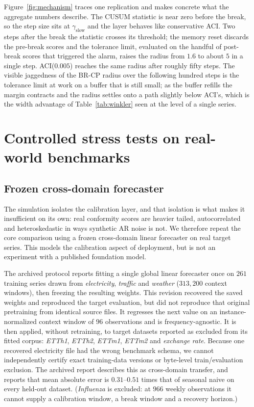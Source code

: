 \documentclass[10pt]{article}
\begin{document}
Figure~\ref{fig:mechanism} traces one replication and makes concrete what the
aggregate numbers describe. The CUSUM statistic is near zero before the break,
so the step size sits at $\gamma_{\text{slow}}$ and the layer behaves like
conservative ACI. Two steps after the break the statistic crosses its
threshold; the memory reset discards the pre-break scores and the tolerance
limit, evaluated on the handful of post-break scores that triggered the alarm,
raises the radius from $1.6$ to about $5$ in a single step. ACI($0.005$) reaches
the same radius after roughly fifty steps. The visible jaggedness of the BR-CP
radius over the following hundred steps is the tolerance limit at work on a
buffer that is still small; as the buffer refills the margin contracts and the
radius settles onto a path slightly below ACI's, which is the width advantage
of Table~\ref{tab:winkler} seen at the level of a single series.

\section{Controlled stress tests on real-world benchmarks}
\label{sec:real}

\subsection{Frozen cross-domain forecaster}

The simulation isolates the calibration layer, and that isolation is what makes
it insufficient on its own: real conformity scores are heavier tailed,
autocorrelated and heteroskedastic in ways synthetic AR noise is not. We
therefore repeat the core comparison using a frozen cross-domain linear
forecaster on real target series. This models the calibration aspect of
deployment, but is not an experiment with a published foundation model.

The archived protocol reports fitting a single global linear forecaster
once on $261$ training series drawn from \emph{electricity},
\emph{traffic} and \emph{weather} ($313{,}200$ context windows),
then freezing the resulting weights. This revision recovered the saved
weights and reproduced the target evaluation, but did not reproduce that
original pretraining from identical source files. It regresses the next value on an instance-normalized context window of $96$ observations and is frequency-agnostic. It is then applied, without retraining, to target
datasets reported as excluded from its fitted corpus: \emph{ETTh1},
\emph{ETTh2}, \emph{ETTm1}, \emph{ETTm2} and \emph{exchange rate}.
Because one recovered electricity file had the wrong benchmark schema,
we cannot independently certify exact training-data versions or
byte-level train/evaluation exclusion. The archived report describes
this as cross-domain transfer, and reports that mean absolute error is $0.31$--$0.51$ times that of seasonal naive on every held-out dataset. (\emph{Influenza} is
excluded: at $966$ weekly observations it cannot supply a calibration window, a
break window and a recovery horizon.)
\end{document}
